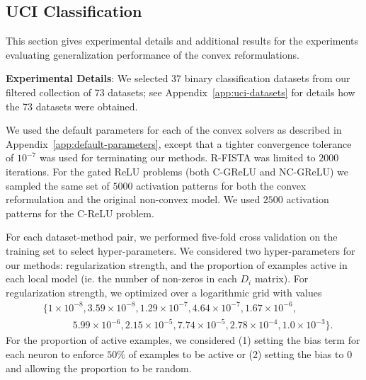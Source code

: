 \subsection{UCI Classification}\label{app:uci-accuracies}

This section gives experimental details and additional results for the experiments evaluating generalization performance of the convex reformulations.

\textbf{Experimental Details}:
We selected 37 binary classification datasets from our filtered collection of 73 datasets;
see Appendix~\ref{app:uci-datasets} for details how the 73 datasets were obtained.

We used the default parameters for each of the convex solvers as described in Appendix~\ref{app:default-parameters},
except that a tighter convergence tolerance of \( 10^{-7} \) was used for terminating our methods.
R-FISTA was limited to \( 2000 \) iterations.
For the gated ReLU problems (both C-GReLU and NC-GReLU) we sampled the same set of \( 5000 \) activation patterns for both the convex reformulation and the original non-convex model.
We used \( 2500 \) activation patterns for the C-ReLU problem.

For each dataset-method pair, we performed five-fold cross validation on the training set
to select hyper-parameters.
We considered two hyper-parameters for our methods: regularization strength,
and the proportion of examples active in each local model (ie. the number of
non-zeros in each \( D_i \) matrix).
For regularization strength, we optimized over a logarithmic grid with values
\begin{align*}
     & \big\{1\times 10^{-8},
    3.59\times 10^{-8},
    1.29\times 10^{-7},
    4.64\times 10^{-7},
    1.67\times 10^{-6},       \\
     & \hspace{3em}
    5.99\times 10^{-6},
    2.15\times 10^{-5},
    7.74\times 10^{-5},
    2.78\times 10^{-4},
    1.0\times 10^{-3}\big\}.
\end{align*}
For the proportion of active examples, we considered (1) setting the bias term
for each neuron to enforce \( 50 \% \) of examples to be active or (2)
setting the bias to \( 0 \) and allowing the proportion to be random.

